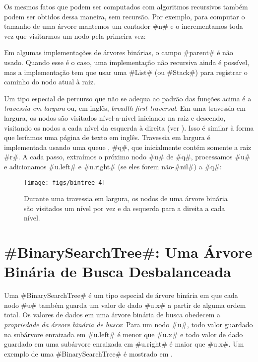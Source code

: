 Os mesmos fatos que podem ser computados com algoritmos recursivos também podem
ser obtidos dessa maneira, sem recursão. Por exemplo, para computar o tamanho 
de uma árvore mantemos um contador #n# e o incrementamos toda vez que visitarmos um nodo pela primeira vez:

Em algumas implementações de árvores binárias, o campo #parent# é não usado.
Quando esse é o caso, uma implementação não recursiva ainda é possível,
mas a implementação tem que usar uma 
#List# (ou #Stack#) para registrar o caminho do nodo atual à raiz.

Um tipo especial de percurso que não se adequa ao padrão das funções acima é a
\emph{travessia em largura} ou, em inglês, \emph{breadth-first traversal}.
%
%
Em uma travessia em largura, os nodos são visitados nível-a-nível iniciando na raiz e descendo, visitando os nodos a cada nível da esquerda à direita (ver
). Isso é similar à forma que leríamos uma página de texto em inglês. Travessia em largura é implementada usando uma queue 
, #q#, que inicialmente contém somente a raiz #r#. A cada passo, 
extraímos o próximo nodo #u# de #q#, processamos #u# e adicionamos #u.left#
e #u.right# (se eles forem não-#nil#) a #q#:

\begin{figure}
  \begin{center}
    \texttt{[image: figs/bintree-4]}
  \end{center}
  \caption{Durante uma travessia em largura, os nodos de uma árvore binária são visitados um nível por vez e da esquerda para a direita a cada nível.}
\end{figure}


\section{#BinarySearchTree#: Uma Árvore Binária de Busca Desbalanceada} 

%
%
%
Uma 
#BinarySearchTree# é um tipo especial de árvore binária em que cada nodo #u# também guarda um valor de dado #u.x# a partir de alguma ordem total.
Os valores de dados em uma árvore binária de busca obedecem a \emph{propriedade da árvore binária de busca}:
%
Para um nodo #u#, todo valor guardado na subárvore enraizada em #u.left#
é menor que #u.x# e todo valor de dado guardado em uma subárvore enraizada 
em #u.right# é maior que #u.x#. Um exemplo de uma
 #BinarySearchTree# é mostrado em .

